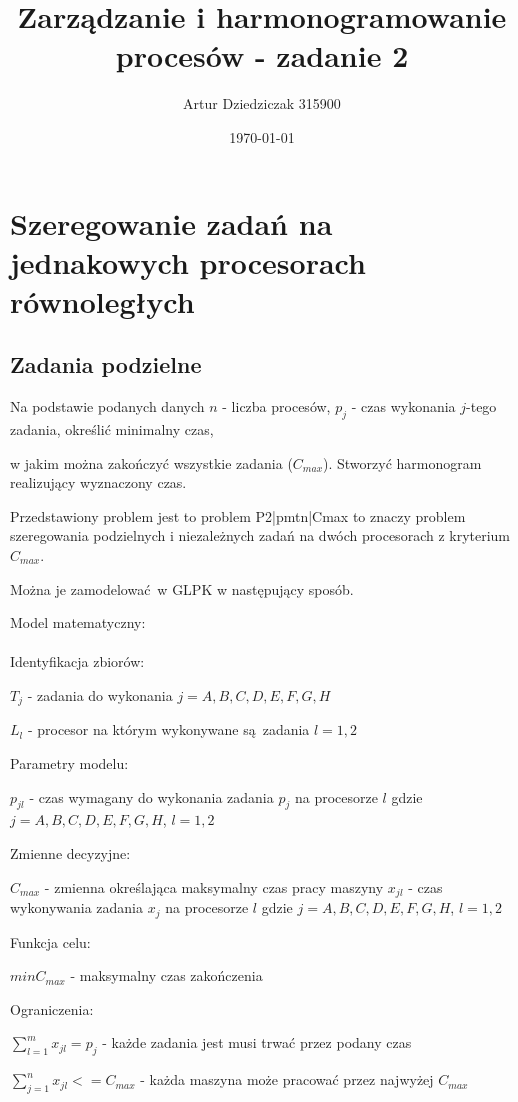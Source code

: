 \documentclass{article}
\title{Zarządzanie i harmonogramowanie procesów - zadanie 2}
\author{Artur Dziedziczak 315900}
\date{\today}
\begin{document}
\maketitle

\section {Szeregowanie zadań na jednakowych procesorach równoległych}
\subsection{Zadania podzielne}

Na podstawie podanych danych \(n\) - liczba procesów,
\(p_j\) - czas wykonania \(j\)-tego zadania, określić minimalny czas,

w jakim można zakończyć wszystkie zadania (\(C_{max}\)).
Stworzyć harmonogram realizujący wyznaczony czas.

Przedstawiony problem jest to problem P2|pmtn|Cmax to znaczy problem szeregowania podzielnych i niezależnych zadań na dwóch procesorach z kryterium $C_{max}$.

Można je zamodelować w GLPK w następujący sposób.

\noindent Model matematyczny: \\\\

\noindent Identyfikacja zbiorów:

$T_j$ - zadania do wykonania $j = {A,B,C,D,E,F,G,H}$

$L_{l}$ - procesor na którym wykonywane są zadania $l = {1,2}$

\noindent Parametry modelu:

$p_{jl}$ - czas wymagany do wykonania zadania $p_j$ na procesorze $l$ gdzie $j = {A,B,C,D,E,F,G,H}$, $l = {1,2}$

\noindent Zmienne decyzyjne:

$C_{max}$ - zmienna określająca maksymalny czas pracy maszyny
$x_{jl}$ - czas wykonywania zadania $x_j$ na procesorze $l$ gdzie $j = {A,B,C,D,E,F,G,H}$, $l = {1,2}$

\noindent Funkcja celu:

$min C_{max}$ - maksymalny czas zakończenia

\noindent Ograniczenia:

$\sum^{m}_{l = 1} x_{jl} = p_j$ - każde zadania jest musi trwać przez podany czas 

$\sum^{n}_{j = 1} x_{jl} <= C_{max}$ - każda maszyna może pracować przez najwyżej $C_{max}$
\end{document}
